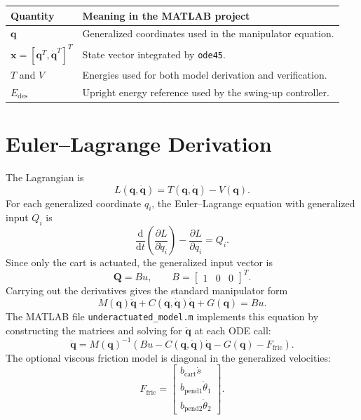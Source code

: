 \documentclass[11pt,a4paper]{article}
\newcommand{\sectionpage}{\clearpage}
\newcommand{\dd}{\mathrm{d}}
\begin{document}
\begin{center}
\begin{tabular}{@{}L{0.26\textwidth}L{0.62\textwidth}@{}}
\toprule
\textbf{Quantity} & \textbf{Meaning in the MATLAB project}\\
\midrule
$\bm q$ & Generalized coordinates used in the manipulator equation.\\
$\bm x=[\bm q^T,\dot{\bm q}^T]^T$ & State vector integrated by \texttt{ode45}.\\
$T$ and $V$ & Energies used for both model derivation and verification.\\
$E_{\mathrm{des}}$ & Upright energy reference used by the swing-up controller.\\
\bottomrule
\end{tabular}
\end{center}

\sectionpage
\section{Euler--Lagrange Derivation}

The Lagrangian is
\begin{equation}
    L(\bm q,\dot{\bm q}) = T(\bm q,\dot{\bm q})-V(\bm q).
\end{equation}
For each generalized coordinate $q_i$, the Euler--Lagrange equation with generalized input $Q_i$ is
\begin{equation}
    \frac{\dd}{\dd t}\left(\frac{\partial L}{\partial \dot{q}_i}\right)
    -\frac{\partial L}{\partial q_i}=Q_i.
\end{equation}
Since only the cart is actuated, the generalized input vector is
\begin{equation}
    \bm Q = B u,\qquad
    B=\begin{bmatrix}1&0&0\end{bmatrix}^{T}.
\end{equation}
Carrying out the derivatives gives the standard manipulator form
\begin{equation}
    M(\bm q)\ddot{\bm q}+C(\bm q,\dot{\bm q})\dot{\bm q}+G(\bm q)=Bu.
\end{equation}
The MATLAB file \texttt{underactuated\_model.m} implements this equation by constructing the matrices and solving for $\ddot{\bm q}$ at each ODE call:
\begin{equation}
    \ddot{\bm q}
    =M(\bm q)^{-1}\!\left(
        Bu-C(\bm q,\dot{\bm q})\dot{\bm q}-G(\bm q)-F_{\mathrm{fric}}
    \right).
\end{equation}
The optional viscous friction model is diagonal in the generalized velocities:
\begin{equation}
    F_{\mathrm{fric}} =
    \begin{bmatrix}
        b_{\mathrm{cart}}\dot{s}\\
        b_{\mathrm{pend1}}\dot{\theta}_1\\
        b_{\mathrm{pend2}}\dot{\theta}_2
    \end{bmatrix}.
\end{equation}
\end{document}
